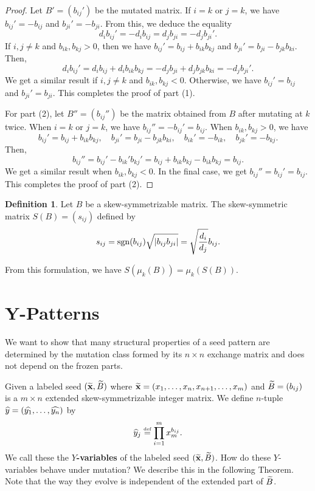 \documentclass[]{pcmi}
\theoremstyle{plain}
\theoremstyle{definition}
\newtheorem{Definition}[equation]{Definition}
\begin{document}
\begin{proof}
    Let $B' = (b_{ij}')$ be the mutated matrix. If $i = k$ or $j = k$, we have $b_{ij}' = -b_{ij}$ and $b_{ji}' = -b_{ji}$. From this, we deduce the equality
    \[
        d_i b_{ij}' = -d_i b_{ij} = d_j b_{ji} = - d_j b_{ji}'. 
    \]
    If $i, j \neq k$ and $b_{ik}, b_{kj} > 0$, then we have $b_{ij}' = b_{ij} + b_{ik}b_{kj}$ and $b_{ji}' = b_{ji} - b_{jk} b_{ki}$. Then, 
    \[
        d_i b_{ij}' = d_i b_{ij} + d_i b_{ik} b_{kj} = -d_j b_{ji} + d_j b_{jk}b_{ki} = -d_j b_{ji}'. 
    \]
    We get a similar result if $i, j \neq k$ and $b_{ik}, b_{kj} < 0$. Otherwise, we have $b_{ij}' = b_{ij}$ and $b_{ji}' = b_{ji}$. This completes the proof of part (1). 

    For part (2), let $B'' = (b_{ij}'')$ be the matrix obtained from $B$ after mutating at $k$ twice. When $i = k$ or $j = k$, we have $b_{ij}'' = -b_{ij}' = b_{ij}$. When $b_{ik}, b_{kj} > 0$, we have 
    \[
        b_{ij}' = b_{ij} + b_{ik}b_{kj}, \quad b_{ji}' = b_{ji} - b_{jk} b_{ki}, \quad b_{ik}' = -b_{ik}, \quad b_{jk}' = - b_{kj}. 
    \]  
    Then, 
    \[
        b_{ij}'' = b_{ij}' - b_{ik}' b_{kj}' = b_{ij} + b_{ik}b_{kj} - b_{ik}b_{kj} = b_{ij}.
    \]
    We get a similar result when $b_{ik}, b_{kj} < 0$. In the final case, we get $b_{ij}'' = b_{ij}' = b_{ij}$. This completes the proof of part (2). 

\end{proof}

\begin{Definition}
    Let $B$ be a skew-symmetrizable matrix. The skew-symmetric matrix $S(B) = (s_{ij})$ defined by 
    \[
        s_{ij} = \operatorname{sgn}(b_{ij}) \sqrt{|b_{ij}b_{ji}|} = \sqrt{\frac{d_i}{d_j}} b_{ij}. 
    \]
\end{Definition}

From this formulation, we have $S(\mu_k(B)) = \mu_k(S(B))$. 

\section{Y-Patterns}

We want to show that many structural properties of a seed pattern are determined by the mutation class formed by its $n \times n$ exchange matrix and does not depend on the frozen parts. 

Given a labeled seed $(\widetilde{\mathbf{x}}, \widetilde{B})$ where $\widetilde{\mathbf{x}} = (x_1, \ldots, x_n, x_{n+1}, \ldots, x_m)$ and $\widetilde{B} = (b_{ij})$ is a $m \times n$ extended skew-symmetrizable integer matrix. We define $n$-tuple $\widehat{y} = (\widehat{y_1}, \ldots, \widehat{y_n})$ by 
\[
    \widehat{y}_j \overset{\textup{\tiny def}}= \prod_{i = 1}^m x_m^{b_{ij}}. 
\]
We call these the \textbf{$Y$-variables} of the labeled seed $(\widetilde{\mathbf{x}}, \widetilde{B})$. How do these $Y$-variables behave under mutation? We describe this in the following Theorem. Note that the way they evolve is independent of the extended part of $\widetilde{B}$. 
\end{document}
